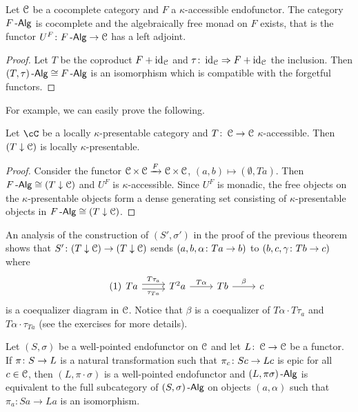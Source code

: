 \documentclass[a4paper,11pt,oneside,openany]{scrbook}
\begin{document}
\begin{thm}
	Let $ \operatorname{\mathcal{C}} $ be a cocomplete category and $ F $ a $ \kappa $-accessible
    endofunctor. The category $ F\operatorname{-\mathsf{Alg}} $ is cocomplete and the algebraically free
    monad on $ F $ exists, that is the functor $U^F \colon F\operatorname{-\mathsf{Alg}} \to \operatorname{\mathcal{C}} $ has a
    left adjoint.
\end{thm}
\begin{proof}
	Let $ T $ be the coproduct $ F + \operatorname{id}_{\operatorname{\mathcal{C}}} $ and $ \tau\colon
    \operatorname{id}_{\operatorname{\mathcal{C}}}\Rightarrow F+\operatorname{id}_{\operatorname{\mathcal{C}}} $ the inclusion.	Then $  (T,\tau)\operatorname{-\mathsf{Alg}} \cong
    F\operatorname{-\mathsf{Alg}} $ is an isomorphism which is compatible with the forgetful functors.
\end{proof}

For example, we can easily prove the following.

\begin{prop}
	Let $ \cC $ be a locally $ \kappa $-presentable category and $ T \colon \operatorname{\mathcal{C}}
		\to \operatorname{\mathcal{C}} $ $ \kappa $-accessible. Then $ (T\downarrow\operatorname{\mathcal{C}}) $ is locally $ \kappa
	$-presentable.
\end{prop}
\begin{proof}
	Consider the functor $ \operatorname{\mathcal{C}} \times \operatorname{\mathcal{C}} \xrightarrow{F} \operatorname{\mathcal{C}} \times \operatorname{\mathcal{C}} $, $ (a,b)\mapsto (\emptyset, Ta) $.
	Then $ F\operatorname{-\mathsf{Alg}} \cong (T\downarrow\operatorname{\mathcal{C}}) $ and $ U^F $ is $ \kappa $-accessible.
	Since $ U^F  $ is monadic, the free objects on the $ \kappa $-presentable objects form a dense generating set consisting of $ \kappa $-presentable objects in $ F\operatorname{-\mathsf{Alg}} \cong (T\downarrow\operatorname{\mathcal{C}}) $.
\end{proof}
\begin{rmk}
	An analysis of the construction of $ (S',\sigma') $ in the proof of the previous theorem shows that $ S' \colon (T\downarrow\operatorname{\mathcal{C}}) \to (T\downarrow\operatorname{\mathcal{C}}) $ sends $ (a,b,\alpha \colon Ta \to b) $ to $ (b,c, \gamma \colon Tb \to c) $ where
	\begin{displaymath}\tag{1}\label{fork1}
		\begin{tikzcd}
			T a \arrow[r,shift left, "T \tau_a"]\arrow[r,shift right, "\tau_{Ta}"']& T^2 a \arrow[r, "T\alpha" ] & Tb \arrow[r, "\beta"]  & c
		\end{tikzcd}
	\end{displaymath}
	is a coequalizer diagram in $ \operatorname{\mathcal{C}} $.
	Notice that $ \beta $ is a coequalizer of $ T\alpha \cdot T\tau_a $ and $
		T\alpha \cdot \tau_{Ta} $ (see the exercises for more details).
\end{rmk}
\begin{prop}
	Let $(S,\sigma)$ be a well-pointed endofunctor on $\operatorname{\mathcal{C}}$ and let
    $L\colon\operatorname{\mathcal{C}}\to\operatorname{\mathcal{C}}$ be a functor.
	If $\pi\colon S\to L$ is a natural transformation such that $\pi_c\colon
	Sc\to Lc$ is epic for all $c\in\operatorname{\mathcal{C}}$, then $(L,\pi\cdot\sigma) $ is
    a well-pointed endofunctor and $(L,\pi\sigma)\operatorname{-\mathsf{Alg}}$ is equivalent to
    the full subcategory of $(S,\sigma)\operatorname{-\mathsf{Alg}}$ on objects $(a,\alpha)$
    such that $\pi_a\colon Sa\to La$ is an isomorphism.
\end{prop}
\end{document}
